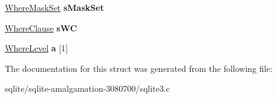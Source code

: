\begin{DoxyCompactItemize}
\item 
\hypertarget{struct_where_info_ae51ef2af01420b9370a844ee32cc5fc5}{\hyperlink{struct_where_mask_set}{Where\+Mask\+Set} {\bfseries s\+Mask\+Set}}\label{struct_where_info_ae51ef2af01420b9370a844ee32cc5fc5}

\item 
\hypertarget{struct_where_info_ab5690a0fa9f78c25a79dd9e50d747fdf}{\hyperlink{struct_where_clause}{Where\+Clause} {\bfseries s\+W\+C}}\label{struct_where_info_ab5690a0fa9f78c25a79dd9e50d747fdf}

\item 
\hypertarget{struct_where_info_a427337160cbeaf64b23a8241fb10dbf9}{\hyperlink{struct_where_level}{Where\+Level} {\bfseries a} \mbox{[}1\mbox{]}}\label{struct_where_info_a427337160cbeaf64b23a8241fb10dbf9}

\end{DoxyCompactItemize}


The documentation for this struct was generated from the following file\+:\begin{DoxyCompactItemize}
\item 
sqlite/sqlite-\/amalgamation-\/3080700/sqlite3.\+c\end{DoxyCompactItemize}
